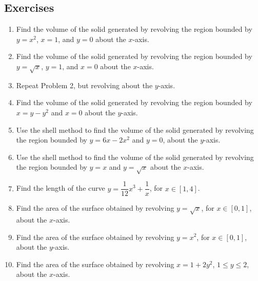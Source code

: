 \documentclass[12pt]{article}
\begin{document}
\subsection*{Exercises}
\begin{enumerate}
 \item Find the volume of the solid generated by revolving the region bounded by $y=x^2$, $x=1$, and $y=0$ about the $x$-axis.
 \item Find the volume of the solid generated by revolving the region bounded by $y=\sqrt{x}$, $y=1$, and $x=0$ about the $x$-axis.
 \item Repeat Problem 2, but revolving about the $y$-axis.
 \item Find the volume of the solid generated by revolving the region bounded by $x=y-y^2$ and $x=0$ about the $y$-axis.
 \item Use the shell method to find the volume of the solid generated by revolving the region bounded by $y=6x-2x^2$ and $y=0$, about the $y$-axis.
 \item Use the shell method to find the volume of the solid generated by revolving the region bounded by $y=x$ and $y=\sqrt{x}$ about the $x$-axis.
 \item Find the length of the curve $y=\dfrac{1}{12}x^3+\dfrac{1}{x}$, for $x\in [1,4]$.
 \item Find the area of the surface obtained by revolving $y=\sqrt{x}$, for $x\in [0,1]$, about the $x$-axis.
 \item Find the area of the surface obtained by revolving $y=x^2$, for $x\in [0,1]$, about the $y$-axis.
 \item Find the area of the surface obtained by revolving $x=1+2y^2$, $1\leq y\leq 2$, about the $x$-axis.
\end{enumerate}
\end{document}
